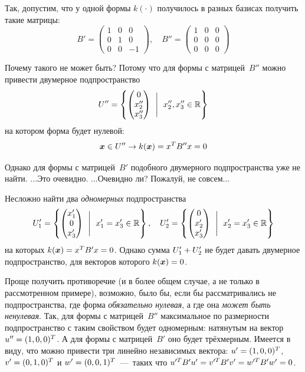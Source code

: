 \documentclass[a4paper,12pt]{article}
\begin{document}
  \begin{example}
    Так, допустим, что у одной формы $k(\cdot)$ получилось в разных базисах получить такие матрицы:
    \[
      B' = \begin{pmatrix}
        1 & 0 & 0\\
        0 & 1 & 0\\
        0 & 0 & -1
      \end{pmatrix},\quad B'' = \begin{pmatrix}
        1 & 0 & 0\\
        0 & 0 & 0\\
        0 & 0 & 0
      \end{pmatrix}
    \]
    
    Почему такого не может быть?
    Потому что для формы с матрицей~$B''$ можно привести двумерное подпространство
    \[
      U'' = \left\{
        \begin{pmatrix}
          0\\
          x_2''\\
          x_3''
        \end{pmatrix}\ \Biggm|\ x_2'', x_3'' \in \operatorname{\mathbb R}
      \right\}
    \]
    на котором форма будет нулевой:
    \[
      \boldsymbol x \in U'' \to k(\boldsymbol x) = x^T B'' x = 0
    \]
    
    Однако для формы с матрицей~$B'$ подобного двумерного подпространства уже не найти.
    ...Это очевидно.
    ...Очевидно ли?
    Пожалуй, не совсем...
    
    Несложно найти два \emph{одномерных} подпространства
    \[
      U_1' = \left\{
        \begin{pmatrix}
          x_1'\\
          0\\
          x_3'
        \end{pmatrix}\ \Biggm|\ x_1' = x_3' \in \operatorname{\mathbb R}
      \right\},\quad U_2' = \left\{
        \begin{pmatrix}
          0\\
          x_2'\\
          x_3'
        \end{pmatrix}\ \Biggm|\ x_2' = x_3' \in \operatorname{\mathbb R}
      \right\}
    \]
    на которых $k(\bds x) \hm= x^T B' x \hm= 0$.
    Однако сумма $U_1' \hm+ U_2'$ не будет давать двумерное подпространство, для векторов которого $k(\bds x) \hm= 0$.
    
    Проще получить противоречие (и в более общем случае, а не только в рассмотренном примере), возможно, было бы, если бы рассматривались не подпространства, где форма \emph{обязательно нулевая}, а где она \emph{может быть ненулевая}.
    Так, для формы с матрицей~$B''$ максимальное по размерности подпространство с таким свойством будет одномерным: натянутым на вектор $u'' \hm= (1, 0, 0)^T$.
    А для формы с матрицей~$B'$ оно будет трёхмерным.
    Имеется в виду, что можно привести три линейно независимых вектора: $u' \hm= (1, 0, 0)^T$, $v' \hm= (0, 1, 0)^T$ и $w' \hm= (0, 0, 1)^T$~---~таких что $u^{\prime T} B' u' \hm= v^{\prime T} B' v' \hm= w^{\prime T} B' w' \hm= 0$.
  \end{example}
  
\end{document}
